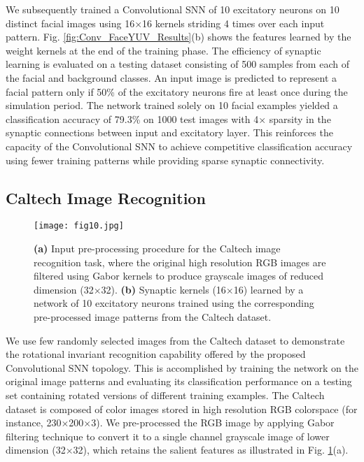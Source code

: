 \documentclass[journal, onecolumn]{IEEEtran}
\begin{document}
We subsequently trained a Convolutional SNN of 10 excitatory neurons on 10 distinct facial images using 16$\times$16 kernels striding 4 times over each input pattern. Fig. \ref{fig:Conv_FaceYUV_Results}(b) shows the features learned by the weight kernels at the end of the training phase. The efficiency of synaptic learning is evaluated on a testing dataset consisting of 500 samples from each of the facial and background classes. An input image is predicted to represent a facial pattern only if 50\% of the excitatory neurons fire at least once during the simulation period. The network trained solely on 10 facial examples yielded a classification accuracy of 79.3\% on 1000 test images with 4$\times$ sparsity in the synaptic connections between input and excitatory layer. This reinforces the capacity of the Convolutional SNN to achieve competitive classification accuracy using fewer training patterns while providing sparse synaptic connectivity.

\subsection*{\normalsize\bf{Caltech Image Recognition}}
\begin{figure}[!t]
\centering
\texttt{[image: fig10.jpg]}
\caption{\textbf{(a)} Input pre-processing procedure for the Caltech image recognition task, where the original high resolution RGB images are filtered using Gabor kernels to produce grayscale images of reduced dimension (32$\times$32). \textbf{(b)} Synaptic kernels (16$\times$16) learned by a network of 10 excitatory neurons trained using the corresponding pre-processed image patterns from the Caltech dataset.}
\label{fig:Conv_Caltech_Results}
\end{figure}

We use few randomly selected images from the Caltech dataset \cite{fei2007learning} to demonstrate the rotational invariant recognition capability offered by the proposed Convolutional SNN topology. This is accomplished by training the network on the original image patterns and evaluating its classification performance on a testing set containing rotated versions of different training examples. The Caltech dataset is composed of color images stored in high resolution RGB colorspace (for instance, 230$\times$200$\times$3). We pre-processed the RGB image by applying Gabor filtering \cite{jain1997object} technique to convert it to a single channel grayscale image of lower dimension (32$\times$32), which retains the salient features as illustrated in Fig. \ref{fig:Conv_Caltech_Results}(a).
\end{document}

